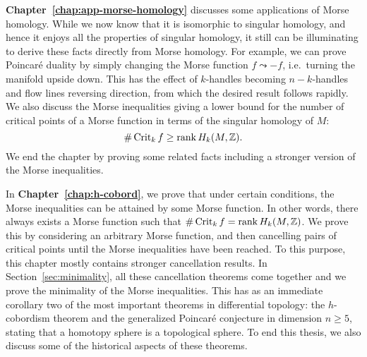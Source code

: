 \bigskip
\textbf{Chapter~\ref{chap:app-morse-homology}} discusses some applications of Morse homology.
While we now know that it is isomorphic to singular homology, and hence it enjoys all the properties of singular homology, it still can be illuminating to derive these facts directly from Morse homology.
For example, we can prove Poincaré duality by simply changing the Morse function $f \leadsto -f$, i.e.\ turning the manifold upside down.  This has the effect of $k$-handles becoming $n-k$-handles and flow lines reversing direction, from which the desired result follows rapidly.
We also discuss the Morse inequalities giving a lower bound for the number of critical points of a Morse function in terms of the singular homology of $M$:
 \[
     \# \operatorname{Crit}_k f \ge \operatorname{rank} H_k(M, \mathbb{Z})
.\] 
We end the chapter by proving some related facts including a stronger version of the Morse inequalities.

\bigskip
In \textbf{Chapter~\ref{chap:h-cobord}}, we prove that under certain conditions, the Morse inequalities can be attained by some Morse function.
In other words, there always exists a Morse function such that $\# \operatorname{Crit}_k f = \operatorname{rank} H_k(M, \mathbb{Z})$.
We prove this by considering an arbitrary Morse function,
and then cancelling pairs of critical points until the Morse inequalities have been reached.
To this purpose, this chapter mostly contains stronger cancellation results.
In Section~\ref{sec:minimality}, all these cancellation theorems come together and we prove the minimality of the Morse inequalities.
This has as an immediate corollary two of the most important theorems in differential topology: the $h$-cobordism theorem and the generalized Poincaré conjecture in dimension $n \ge 5$, stating that a homotopy sphere is a topological sphere.
To end this thesis, we also discuss some of the historical aspects of these theorems.
